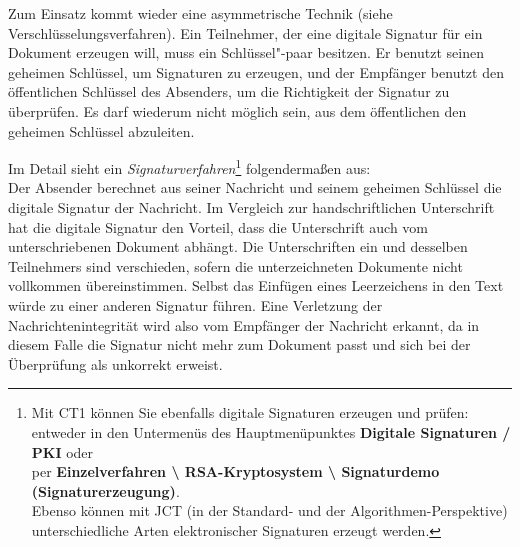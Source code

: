 \begin{refsegment}
Zum Einsatz kommt wieder eine asymmetrische Technik (siehe
Verschlüsselungsverfahren).
Ein Teilnehmer, der eine digitale Signatur für ein Dokument erzeugen will,
muss ein Schlüssel"-paar besitzen. Er benutzt seinen geheimen Schlüssel,
um Signaturen zu erzeugen, und der Empfänger benutzt den öffentlichen
Schlüssel des Absenders, um die Richtigkeit der Signatur zu überprüfen.
Es darf wiederum nicht möglich sein, aus dem öffentlichen den geheimen
Schlüssel abzuleiten.

Im Detail sieht ein 
{\em Signaturverfahren}\footnote{%
Mit CT1 können Sie ebenfalls digitale Signaturen
erzeugen und prüfen:\\
entweder in den Untermenüs des Hauptmenüpunktes
{\bf Digitale Signaturen / PKI} oder\\
per
{\bf Einzelverfahren \textbackslash{} RSA-Kryptosystem \textbackslash{}
Signaturdemo (Signaturerzeugung)}.\\
Ebenso können mit JCT (in der Standard- und der
Algorithmen-Perspektive) unterschiedliche Arten elektronischer Signaturen
erzeugt werden.
}
folgendermaßen aus:\\
Der Absender berechnet aus seiner Nachricht und seinem geheimen Schlüssel
die digitale Signatur der Nachricht. Im Vergleich zur handschriftlichen
Unterschrift hat die digitale Signatur den Vorteil, dass die
Unterschrift auch vom unterschriebenen Dokument abhängt. Die Unterschriften
ein und desselben Teilnehmers sind verschieden, sofern die unterzeichneten
Dokumente nicht vollkommen übereinstimmen. Selbst das Einfügen eines
Leerzeichens in den Text würde zu einer anderen Signatur führen. Eine
Verletzung der Nachrichtenintegrität wird also vom Empfänger der
Nachricht erkannt, da in diesem Falle die Signatur nicht mehr zum Dokument
passt und sich bei der Überprüfung als unkorrekt erweist.


\end{refsegment}
